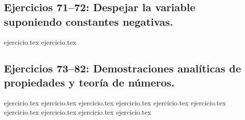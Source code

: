 \subsection*{Ejercicios 71--72: Despejar la variable suponiendo constantes negativas.}
\begin{enumerate}
    \setcounter{enumi}{70}
    {ejercicio.tex}
    {ejercicio.tex}
\end{enumerate}

\subsection*{Ejercicios 73--82: Demostraciones analíticas de propiedades y teoría de números.}
\begin{enumerate}
    \setcounter{enumi}{72}
    {ejercicio.tex}
    {ejercicio.tex}
    {ejercicio.tex}
    {ejercicio.tex}
    {ejercicio.tex}
    {ejercicio.tex}
    {ejercicio.tex}
    {ejercicio.tex}
    {ejercicio.tex}
    {ejercicio.tex}
\end{enumerate}
